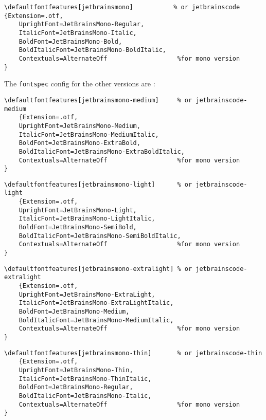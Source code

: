 \documentclass{article}
\begin{document}
\begin{lstlisting}[language={[latex]TeX},basicstyle=\footnotesize\ttfamily,commentstyle=\itshape\color{gray},keywordstyle=\color{magenta},tabsize=4,frame=single]
\defaultfontfeatures[jetbrainsmono]           % or jetbrainscode
{Extension=.otf,
    UprightFont=JetBrainsMono-Regular,
    ItalicFont=JetBrainsMono-Italic,
    BoldFont=JetBrainsMono-Bold,
    BoldItalicFont=JetBrainsMono-BoldItalic,
    Contextuals=AlternateOff                   %for mono version
}
\end{lstlisting}

The \texttt{fontspec} config for the other versions are :

\begin{lstlisting}[language={[latex]TeX},basicstyle=\footnotesize\ttfamily,commentstyle=\itshape\color{gray},keywordstyle=\color{magenta},tabsize=4,frame=single]
\defaultfontfeatures[jetbrainsmono-medium]     % or jetbrainscode-medium
    {Extension=.otf,
    UprightFont=JetBrainsMono-Medium,
    ItalicFont=JetBrainsMono-MediumItalic,
    BoldFont=JetBrainsMono-ExtraBold,
    BoldItalicFont=JetBrainsMono-ExtraBoldItalic,
    Contextuals=AlternateOff                   %for mono version
}
\end{lstlisting}

\begin{lstlisting}[language={[latex]TeX},basicstyle=\footnotesize\ttfamily,commentstyle=\itshape\color{gray},keywordstyle=\color{magenta},tabsize=4,frame=single]
\defaultfontfeatures[jetbrainsmono-light]      % or jetbrainscode-light
    {Extension=.otf,
    UprightFont=JetBrainsMono-Light,
    ItalicFont=JetBrainsMono-LightItalic,
    BoldFont=JetBrainsMono-SemiBold,
    BoldItalicFont=JetBrainsMono-SemiBoldItalic,
    Contextuals=AlternateOff                   %for mono version
}
\end{lstlisting}

\begin{lstlisting}[language={[latex]TeX},basicstyle=\footnotesize\ttfamily,commentstyle=\itshape\color{gray},keywordstyle=\color{magenta},tabsize=4,frame=single]
\defaultfontfeatures[jetbrainsmono-extralight] % or jetbrainscode-extralight
    {Extension=.otf,
    UprightFont=JetBrainsMono-ExtraLight,
    ItalicFont=JetBrainsMono-ExtraLightItalic,
    BoldFont=JetBrainsMono-Medium,
    BoldItalicFont=JetBrainsMono-MediumItalic,
    Contextuals=AlternateOff                   %for mono version
}
\end{lstlisting}

\begin{lstlisting}[language={[latex]TeX},basicstyle=\footnotesize\ttfamily,commentstyle=\itshape\color{gray},keywordstyle=\color{magenta},tabsize=4,frame=single]
\defaultfontfeatures[jetbrainsmono-thin]       % or jetbrainscode-thin
    {Extension=.otf,
    UprightFont=JetBrainsMono-Thin,
    ItalicFont=JetBrainsMono-ThinItalic,
    BoldFont=JetBrainsMono-Regular,
    BoldItalicFont=JetBrainsMono-Italic,
    Contextuals=AlternateOff                   %for mono version
}
\end{lstlisting}
\end{document}
